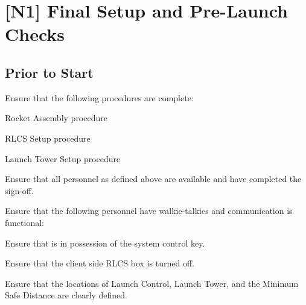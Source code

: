 \section{[N1] Final Setup and Pre-Launch Checks} 
\subsection{Prior to Start}
\begin{checklist}
    \item Ensure that the following procedures are complete:
    \begin{checklist}
        \item Rocket Assembly procedure
        \item RLCS Setup procedure
        \item Launch Tower Setup procedure
    \end{checklist}
    \item Ensure that all personnel as defined above are available and have completed the sign-off.
    \item Ensure that the following personnel have walkie-talkies and communication is functional:
    \begin{checklist}
        \item \ops{}
        \item \control{}
        \item \primary{}
        \item \secondary{}
    \end{checklist}
    \item Ensure that \ops{} is in possession of the system control key.
    \item Ensure that the client side RLCS box is turned off.
    \item Ensure that the locations of Launch Control, Launch Tower, and the Minimum Safe Distance are clearly defined.
    
\end{checklist}
\setcounter{checklistnum}{0}


